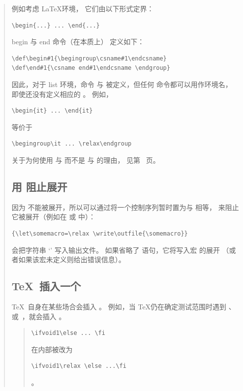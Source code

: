 \documentclass[a4paper]{rapport3}
\newenvironment{disp}{\begin{quotation}}{\end{quotation}}
\newenvironment{example}{\begin{quotation}}{\end{quotation}}
\begin{document}
\begin{disp}
例如考虑 \LaTeX 环境，
它们由以下形式定界： \begin{verbatim}
\begin{...} ... \end{...}
\end{verbatim}
begin 与 end 命令（在本质上）
定义如下：
\begin{verbatim}
\def\begin#1{\begingroup\csname#1\endcsname}
\def\end#1{\csname end#1\endcsname \endgroup}
\end{verbatim}
因此，对于 list 环境，命令
 与  被定义，但任何
命令都可以用作环境名，
即使还没有定义相应的 。
例如，\begin{verbatim}
\begin{it} ... \end{it}
\end{verbatim}
等价于 
\begin{verbatim}
\begingroup\it ... \relax\endgroup
\end{verbatim}
关于为何使用  与 
而不是  与  的理由，
见第~\pageref{begin:end:macros} 页。

\subsection{用  阻止展开}

因为 
不能被展开，所以可以通过将一个控制序列暂时置为与  相等，
来阻止它被展开（例如在  或  中）：
\begin{verbatim}
{\let\somemacro=\relax \write\outfile{\somemacro}}
\end{verbatim}
会把字符串 `' 写入输出文件。
如果省略了  语句，它将写入宏  的展开
（或者如果该宏未定义则给出错误信息）。

\subsection{\TeX\ 插入一个 }
\label{bump:relax}

\TeX\ 自身在某些场合会插入 。
例如，当 \TeX 仍在确定测试范围时遇到
、 或~，就会插入 。 
\begin{example}
\begin{verbatim}
\ifvoid1\else ... \fi
\end{verbatim}
在内部被改为
\begin{verbatim}
\ifvoid1\relax \else ...\fi
\end{verbatim}
。
\end{example}


\end{disp}
\end{document}
